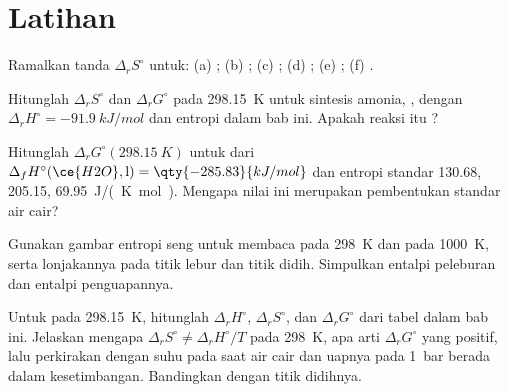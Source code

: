 \section{Latihan}

\begin{exercise}[$\star$]\label{exo:b2:reaction-free-energy:1}
Ramalkan tanda $\Delta_r S^\circ$ untuk: (a) ;
(b) ; (c) ;
(d) ; (e) ;
(f) .
\end{exercise}

\begin{exercise}[$\star$]\label{exo:b2:reaction-free-energy:2}
Hitunglah $\Delta_r S^\circ$ dan $\Delta_r G^\circ$ pada \qty{298.15}{K}
untuk sintesis amonia, , dengan
$\Delta_r
H^\circ = \qty{-91.9}{kJ/mol}$ dan entropi dalam bab ini.
Apakah reaksi itu ?
\end{exercise}

\begin{exercise}[$\star$]\label{exo:b2:reaction-free-energy:3}
Hitunglah $\Delta_r G^\circ(\qty{298.15}{K})$ untuk  dari $\Delta_f H^\circ(\ce{H2O}, \text{l}) = \qty{-285.83}{kJ/mol}$
dan entropi standar  130.68,  205.15, 
\qty{69.95}{J/(K.mol)}. Mengapa nilai ini merupakan 
pembentukan standar air cair?
\end{exercise}

\begin{exercise}[$\star$]\label{exo:b2:reaction-free-energy:4}
Gunakan gambar entropi seng untuk membaca  pada
\qty{298}{K} dan pada \qty{1000}{K}, serta lonjakannya pada titik lebur
dan titik didih. Simpulkan entalpi peleburan dan entalpi penguapannya.
\end{exercise}

\begin{exercise}[$\star\star$]\label{exo:b2:reaction-free-energy:5}
Untuk  pada \qty{298.15}{K}, hitunglah
$\Delta_r H^\circ$, $\Delta_r S^\circ$, dan $\Delta_r G^\circ$ dari tabel
dalam bab ini. Jelaskan mengapa $\Delta_r S^\circ \neq \Delta_r H^\circ/T$
pada \qty{298}{K}, apa arti $\Delta_r G^\circ$ yang positif, lalu
perkirakan dengan  suhu pada saat air cair dan uapnya
pada \qty{1}{bar} berada dalam kesetimbangan. Bandingkan dengan titik
didihnya.
\end{exercise}

